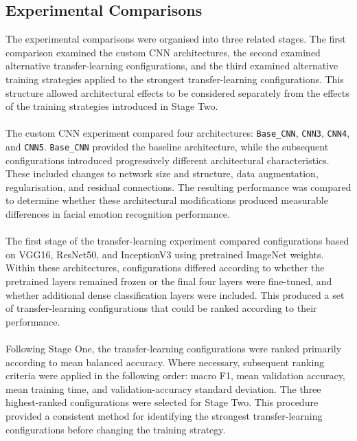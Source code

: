 \documentclass[12pt, a4paper]{report}
\let\oldsubsection\subsection
\renewcommand{\subsection}{%
    \Needspace{6\baselineskip}%
    \oldsubsection
}
\begin{document}
			\subsection{Experimental Comparisons}
			\label{sec:experimental_comparisons}
				
				The experimental comparisons were organised into three related stages. The first comparison examined the custom CNN architectures, the second examined alternative transfer-learning configurations, and the third examined alternative training strategies applied to the strongest transfer-learning configurations. This structure allowed architectural effects to be considered separately from the effects of the training strategies introduced in Stage Two.\\\\
				The custom CNN experiment compared four architectures: \texttt{Base\_CNN}, \texttt{CNN3}, \texttt{CNN4}, and \texttt{CNN5}. \texttt{Base\_CNN} provided the baseline architecture, while the subsequent configurations introduced progressively different architectural characteristics. These included changes to network size and structure, data augmentation, regularisation, and residual connections. The resulting performance was compared to determine whether these architectural modifications produced measurable differences in facial emotion recognition performance.\\\\
				The first stage of the transfer-learning experiment compared configurations based on VGG16, ResNet50, and InceptionV3 using pretrained ImageNet weights. Within these architectures, configurations differed according to whether the pretrained layers remained frozen or the final four layers were fine-tuned, and whether additional dense classification layers were included. This produced a set of transfer-learning configurations that could be ranked according to their performance.\\\\
				Following Stage One, the transfer-learning configurations were ranked primarily according to mean balanced accuracy. Where necessary, subsequent ranking criteria were applied in the following order: macro F1, mean validation accuracy, mean training time, and validation-accuracy standard deviation. The three highest-ranked configurations were selected for Stage Two. This procedure provided a consistent method for identifying the strongest transfer-learning configurations before changing the training strategy.\\\\
\end{document}
